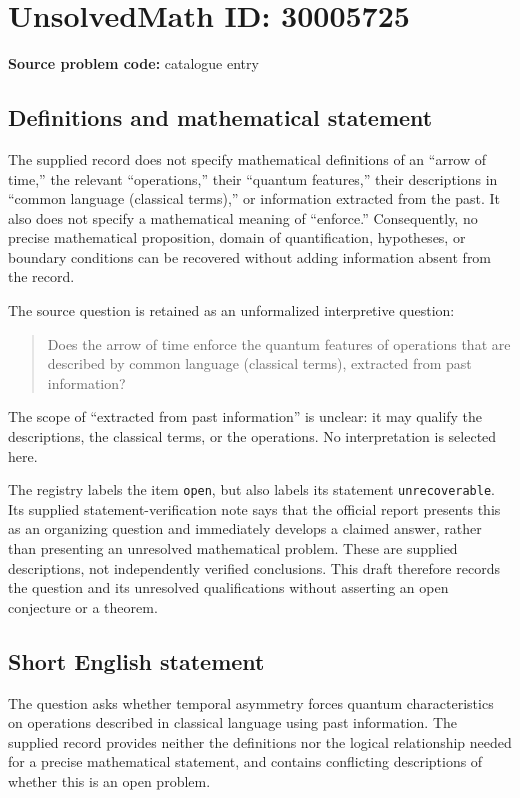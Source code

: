 \documentclass[11pt]{article}
\begin{document}
\section*{UnsolvedMath ID: 30005725}
\textbf{Source problem code:} catalogue entry
\subsection{Definitions and mathematical statement}
The supplied record does not specify mathematical definitions of an ``arrow of time,'' the relevant ``operations,'' their ``quantum features,'' their descriptions in ``common language (classical terms),'' or information extracted from the past. It also does not specify a mathematical meaning of ``enforce.'' Consequently, no precise mathematical proposition, domain of quantification, hypotheses, or boundary conditions can be recovered without adding information absent from the record.

The source question is retained as an unformalized interpretive question:
\begin{quote}
Does the arrow of time enforce the quantum features of operations that are described by common language (classical terms), extracted from past information?
\end{quote}
The scope of ``extracted from past information'' is unclear: it may qualify the descriptions, the classical terms, or the operations. No interpretation is selected here.

The registry labels the item \texttt{open}, but also labels its statement \texttt{unrecoverable}. Its supplied statement-verification note says that the official report presents this as an organizing question and immediately develops a claimed answer, rather than presenting an unresolved mathematical problem. These are supplied descriptions, not independently verified conclusions. This draft therefore records the question and its unresolved qualifications without asserting an open conjecture or a theorem.
\subsection{Short English statement}
The question asks whether temporal asymmetry forces quantum characteristics on operations described in classical language using past information. The supplied record provides neither the definitions nor the logical relationship needed for a precise mathematical statement, and contains conflicting descriptions of whether this is an open problem.
\end{document}
